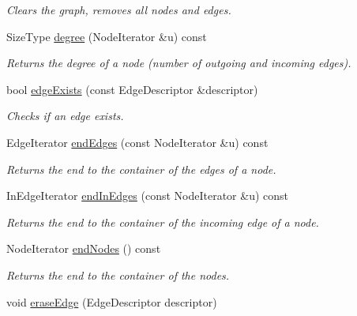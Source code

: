 \begin{DoxyCompactItemize}
\begin{DoxyCompactList}\small\item\em Clears the graph, removes all nodes and edges. \item\end{DoxyCompactList}\item 
SizeType \hyperlink{class_dynamic_graph_a1cd46c594141888b39788aa2096c5e3c}{degree} (NodeIterator \&u) const 
\begin{DoxyCompactList}\small\item\em Returns the degree of a node (number of outgoing and incoming edges). \item\end{DoxyCompactList}\item 
bool \hyperlink{class_dynamic_graph_a7dabd7e0a75dfff8aba6a80f522886f4}{edgeExists} (const EdgeDescriptor \&descriptor)
\begin{DoxyCompactList}\small\item\em Checks if an edge exists. \item\end{DoxyCompactList}\item 
EdgeIterator \hyperlink{class_dynamic_graph_a71a4d1b575bcccf1a189bc83ab3d1373}{endEdges} (const NodeIterator \&u) const 
\begin{DoxyCompactList}\small\item\em Returns the end to the container of the edges of a node. \item\end{DoxyCompactList}\item 
InEdgeIterator \hyperlink{class_dynamic_graph_a4c3d5c37c993efd3a1e91b80e2323635}{endInEdges} (const NodeIterator \&u) const 
\begin{DoxyCompactList}\small\item\em Returns the end to the container of the incoming edge of a node. \item\end{DoxyCompactList}\item 
NodeIterator \hyperlink{class_dynamic_graph_aad1f2b2f345476a1abe94c2f4dc45a9c}{endNodes} () const 
\begin{DoxyCompactList}\small\item\em Returns the end to the container of the nodes. \item\end{DoxyCompactList}\item 
void \hyperlink{class_dynamic_graph_af648cec2163d1f7c5e8da88bf389eb02}{eraseEdge} (EdgeDescriptor descriptor)

\end{DoxyCompactItemize}

